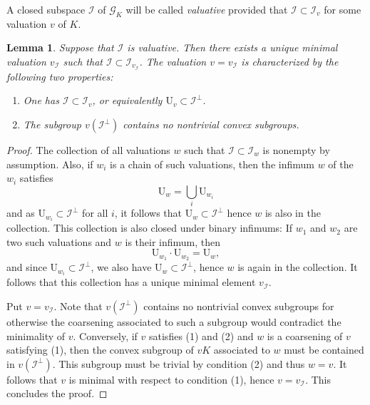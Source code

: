 \documentclass[12pt]{amsart}
\newcommand{\Urm}{\mathrm{U}}
\newcommand{\Gcal}{\mathcal{G}}
\newcommand{\Ical}{\mathcal{I}}
\newtheorem{lemma}[theorem]{Lemma}
\theoremstyle{definition}
\begin{document}
A closed subspace $\Ical$ of $\Gcal_{K}$ will be called \emph{valuative} provided that $\Ical \subset \Ical_{v}$ for some valuation $v$ of $K$.
\begin{lemma}\label{lemma:main-valuative}
  Suppose that $\Ical$ is valuative.
  Then there exists a unique minimal valuation $v_{\Ical}$ such that $\Ical \subset \Ical_{v_{\Ical}}$.
  The valuation $v = v_{\Ical}$ is characterized by the following two properties:
  \begin{enumerate}
    \item One has $\Ical \subset \Ical_{v}$, or equivalently $\Urm_{v} \subset \Ical^{\perp}$.
    \item The subgroup $v(\Ical^{\perp})$ contains no nontrivial convex subgroups.
  \end{enumerate}
\end{lemma}
\begin{proof}
  The collection of all valuations $w$ such that $\Ical \subset \Ical_{w}$ is nonempty by assumption.
  Also, if $w_{i}$ is a chain of such valuations, then the infimum $w$ of the $w_{i}$ satisfies
  \[ \Urm_{w} = \bigcup_{i} \Urm_{w_{i}} \]
  and as $\Urm_{w_{i}} \subset \Ical^{\perp}$ for all $i$, it follows that $\Urm_{w} \subset \Ical^{\perp}$ hence $w$ is also in the collection.
  This collection is also closed under binary infimums: If $w_{1}$ and $w_{2}$ are two such valuations and $w$ is their infimum, then
  \[ \Urm_{w_{1}} \cdot \Urm_{w_{2}} = \Urm_{w}, \]
  and since $\Urm_{w_{i}} \subset \Ical^{\perp}$, we also have $\Urm_{w} \subset \Ical^{\perp}$, hence $w$ is again in the collection.
  It follows that this collection has a unique minimal element $v_{\Ical}$.

  Put $v = v_{\Ical}$.
  Note that $v(\Ical^{\perp})$ contains no nontrivial convex subgroups for otherwise the coarsening associated to such a subgroup would contradict the minimality of $v$.
  Conversely, if $v$ satisfies (1) and (2) and $w$ is a coarsening of $v$ satisfying (1), then the convex subgroup of $vK$ associated to $w$ must be contained in $v(\Ical^{\perp})$.
  This subgroup must be trivial by condition (2) and thus $w = v$.
  It follows that $v$ is minimal with respect to condition (1), hence $v = v_{\Ical}$.
  This concludes the proof.
\end{proof}
\end{document}
